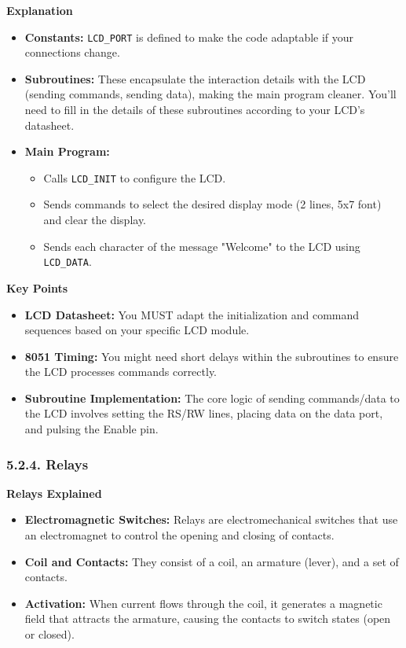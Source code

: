 \documentclass[
]{article}
\begin{document}
\textbf{Explanation}

\begin{itemize}
\item
  \textbf{Constants:} \texttt{LCD\_PORT} is defined to make the code
  adaptable if your connections change.
\item
  \textbf{Subroutines:} These encapsulate the interaction details with
  the LCD (sending commands, sending data), making the main program
  cleaner. You'll need to fill in the details of these subroutines
  according to your LCD's datasheet.
\item
  \textbf{Main Program:}

  \begin{itemize}
  \item
    Calls \texttt{LCD\_INIT} to configure the LCD.
  \item
    Sends commands to select the desired display mode (2 lines, 5x7
    font) and clear the display.
  \item
    Sends each character of the message "Welcome" to the LCD using
    \texttt{LCD\_DATA}.
  \end{itemize}
\end{itemize}

\textbf{Key Points}

\begin{itemize}
\item
  \textbf{LCD Datasheet:} You MUST adapt the initialization and command
  sequences based on your specific LCD module.
\item
  \textbf{8051 Timing:} You might need short delays within the
  subroutines to ensure the LCD processes commands correctly.
\item
  \textbf{Subroutine Implementation:} The core logic of sending
  commands/data to the LCD involves setting the RS/RW lines, placing
  data on the data port, and pulsing the Enable pin.
\end{itemize}

\hypertarget{524-relays}{%
\subsubsection{5.2.4. Relays}\label{524-relays}}

\textbf{Relays Explained}

\begin{itemize}
\item
  \textbf{Electromagnetic Switches:} Relays are electromechanical
  switches that use an electromagnet to control the opening and closing
  of contacts.
\item
  \textbf{Coil and Contacts:} They consist of a coil, an armature
  (lever), and a set of contacts.
\item
  \textbf{Activation:} When current flows through the coil, it generates
  a magnetic field that attracts the armature, causing the contacts to
  switch states (open or closed).
\end{itemize}
\end{document}
